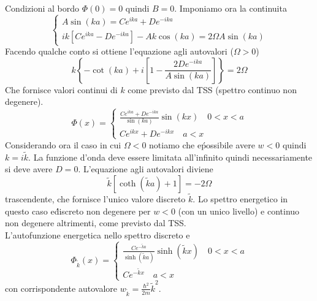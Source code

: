\documentclass[a4paper]{article}
\begin{document}
        Condizioni al bordo $\Phi(0)=0$ quindi $B=0$.
        Imponiamo ora la continuita\'
        \begin{equation*}
            \begin{cases}
                A\sin(ka)=Ce^{ika}+De^{-ika}\\
                ik\left[Ce^{ika}-De^{-ika}\right]-Ak\cos(ka)=2\Omega A\sin(ka)
            \end{cases}
        \end{equation*}
        Facendo qualche conto si ottiene l'equazione agli autovalori ($\Omega>0$)
        \begin{equation*}
            k\left\{-\cot(ka)+i\left[1-\frac{2De^{-ika}}{A\sin(ka)}\right]\right\}=2\Omega
        \end{equation*}
        Che fornisce valori continui di $k$ come previsto dal TSS (spettro continuo non degenere).
        \begin{equation*}
            \Phi(x)=
            \begin{cases}
                \frac{Ce^{ika}+De^{-ika}}{\sin(ka)}\sin(kx)\quad 0<x<a\\
                Ce^{ikx}+De^{-ikx}\quad a<x
            \end{cases}
        \end{equation*}
        Considerando ora il caso in cui $\Omega<0$ notiamo che e\' possibile avere $w<0$ quindi $k=i\tilde{k}$.
        La funzione d'onda deve essere limitata all'infinito quindi necessariamente si deve avere $D=0$.
        L'equazione agli autovalori diviene
        \begin{equation*}
            \tilde{k}\left[\coth(\tilde{k}a)+1\right]=-2\Omega
        \end{equation*}
        trascendente, che fornisce l'unico valore discreto $\tilde{k}$.
        Lo spettro energetico in questo caso e\' discreto non degenere per $w<0$ (con un unico livello) e continuo non degenere altrimenti, come previsto dal TSS.\\
        L'autofunzione energetica nello spettro discreto e\'
        \begin{equation*}
            \Phi_{\tilde{k}}(x)=
            \begin{cases}
                \frac{Ce^{-\tilde{k}a}}{\sinh(\tilde{k}a)}\sinh(\tilde{k}x)\quad 0<x<a\\
                Ce^{-\tilde{k}x}\quad a<x
            \end{cases}
        \end{equation*}
        con corrispondente autovalore $w_{\tilde{k}}=\frac{\hbar^2}{2m}\tilde{k}^2$.
        
\end{document}

